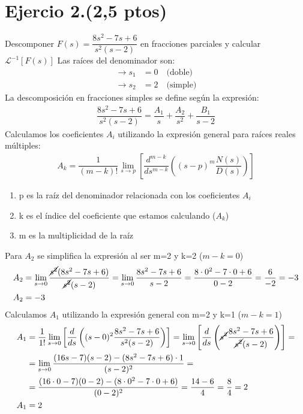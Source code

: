 \documentclass{article}
\begin{document}
\section*{Ejercio 2.(2,5 ptos)}
Descomponer $F(s) = \dfrac{8s^2 - 7s + 6}{s^2 (s - 2)}$ en fracciones parciales y calcular $\mathcal{L}^{-1}[F(s)]$
Las raíces del denominador son:
\begin{align*}
    \rightarrow s_1 &= 0 \quad \text{(doble)} \\
    \rightarrow s_2 &= 2 \quad \text{(simple)}
\end{align*}
La descomposición en fracciones simples se define según la expresión:
\begin{align*}
    \dfrac{8s^2 - 7s + 6}{s^2 (s - 2)}
    = \dfrac{A_1}{s}
    + \dfrac{A_2}{s^2}
    + \dfrac{B_1}{s - 2}
\end{align*}
Calculamos los coeficientes $A_i$ utilizando la expresión general para raíces reales múltiples:
\begin{align*}
    A_k
    = \dfrac{1}{(m - k)!} \lim_{s \to p} \left[\dfrac{d^{m-k}}{ds^{m-k}}\left((s - p)^m \dfrac{N(s)}{D(s)}\right)\right]
\end{align*}
\begin{enumerate}
    \item p es la raíz del denominador relacionada con los coeficientes $A_i$
    \item k es el índice del coeficiente que estamos calculando ($A_k$)
    \item m es la multiplicidad de la raíz
\end{enumerate}
Para $A_2$ se simplifica la expresión al ser 
m=2 y k=2 ($m-k = 0$)
\begin{align*}
    A_2 
    &= \lim_{s \to 0} \dfrac{\cancel{s^2} (8s^2 - 7s + 6)}{\cancel{s^2}(s - 2)}
    = \lim_{s \to 0} \dfrac{8s^2 - 7s + 6}{s - 2} 
    = \dfrac{8 \cdot 0^2 - 7 \cdot 0 + 6}{0 - 2} 
    = \dfrac{6}{-2}
    = -3\\ 
    A_2 &= -3 \\
\end{align*}
Calculamos $A_1$ utilizando la expresión general con m=2 y k=1 ($m-k = 1$)
\begin{align*}    
    A_1
    &= \dfrac{1}{1!}\lim_{s \to 0} \left[\dfrac{d}{ds}\left((s-0)^2\dfrac{8s^2 - 7s + 6}{s^2 (s - 2)}\right)\right]
    = \lim_{s \to 0} \left[\dfrac{d}{ds}\left(\cancel{s^2}\dfrac{8s^2 - 7s + 6}{\cancel{s^2} (s - 2)}\right)\right] = \\
    &= \lim_{s \to 0} \dfrac{(16s - 7)(s - 2) - (8s^2 - 7s + 6) \cdot 1}{(s - 2)^2} = \\ 
    &= \dfrac{(16 \cdot 0 - 7)(0 - 2) - (8 \cdot 0^2 - 7 \cdot 0 + 6)}{(0 - 2)^2} 
    = \dfrac{14 - 6}{4}
    = \dfrac{8}{4}
    = 2 \\
    A_1 &= 2
\end{align*}
\end{document}
